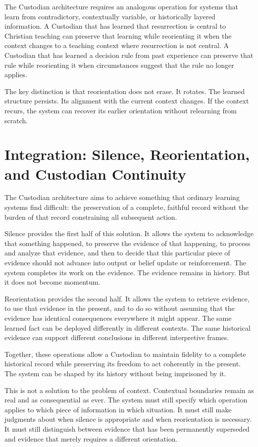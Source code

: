 \documentclass[12pt]{article}
\begin{document}
The Custodian architecture requires an analogous operation for systems that learn from contradictory, contextually variable, or historically layered information. A Custodian that has learned that resurrection is central to Christian teaching can preserve that learning while reorienting it when the context changes to a teaching context where resurrection is not central. A Custodian that has learned a decision rule from past experience can preserve that rule while reorienting it when circumstances suggest that the rule no longer applies.

The key distinction is that reorientation does not erase. It rotates. The learned structure persists. Its alignment with the current context changes. If the context recurs, the system can recover its earlier orientation without relearning from scratch.

\section{Integration: Silence, Reorientation, and Custodian Continuity}

The Custodian architecture aims to achieve something that ordinary learning systems find difficult: the preservation of a complete, faithful record without the burden of that record constraining all subsequent action.

Silence provides the first half of this solution. It allows the system to acknowledge that something happened, to preserve the evidence of that happening, to process and analyze that evidence, and then to decide that this particular piece of evidence should not advance into output or belief update or reinforcement. The system completes its work on the evidence. The evidence remains in history. But it does not become momentum.

Reorientation provides the second half. It allows the system to retrieve evidence, to use that evidence in the present, and to do so without assuming that the evidence has identical consequences everywhere it might appear. The same learned fact can be deployed differently in different contexts. The same historical evidence can support different conclusions in different interpretive frames.

Together, these operations allow a Custodian to maintain fidelity to a complete historical record while preserving its freedom to act coherently in the present. The system can be shaped by its history without being imprisoned by it.

This is not a solution to the problem of context. Contextual boundaries remain as real and as consequential as ever. The system must still specify which operation applies to which piece of information in which situation. It must still make judgments about when silence is appropriate and when reorientation is necessary. It must still distinguish between evidence that has been permanently superseded and evidence that merely requires a different orientation.
\end{document}

